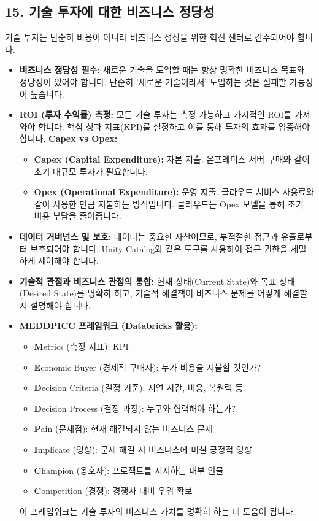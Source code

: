 \documentclass[11pt,a4paper]{article}
\theoremstyle{definition}
\begin{document}
\subsection*{15. 기술 투자에 대한 비즈니스 정당성}

기술 투자는 단순히 비용이 아니라 비즈니스 성장을 위한 혁신 센터로 간주되어야 합니다.

\begin{itemize}
    \item \textbf{비즈니스 정당성 필수:} 새로운 기술을 도입할 때는 항상 명확한 비즈니스 목표와 정당성이 있어야 합니다. 단순히 '새로운 기술이라서' 도입하는 것은 실패할 가능성이 높습니다.
    \item \textbf{ROI (투자 수익률) 측정:} 모든 기술 투자는 측정 가능하고 가시적인 ROI를 가져와야 합니다. 핵심 성과 지표(KPI)를 설정하고 이를 통해 투자의 효과를 입증해야 합니다.
    \textbf{Capex vs Opex:}
    \begin{itemize}
        \item \textbf{Capex (Capital Expenditure):} 자본 지출. 온프레미스 서버 구매와 같이 초기 대규모 투자가 필요합니다.
        \item \textbf{Opex (Operational Expenditure):} 운영 지출. 클라우드 서비스 사용료와 같이 사용한 만큼 지불하는 방식입니다. 클라우드는 Opex 모델을 통해 초기 비용 부담을 줄여줍니다.
    \end{itemize}
    \item \textbf{데이터 거버넌스 및 보호:} 데이터는 중요한 자산이므로, 부적절한 접근과 유출로부터 보호되어야 합니다. Unity Catalog와 같은 도구를 사용하여 접근 권한을 세밀하게 제어해야 합니다.
    \item \textbf{기술적 관점과 비즈니스 관점의 통합:} 현재 상태(Current State)와 목표 상태(Desired State)를 명확히 하고, 기술적 해결책이 비즈니스 문제를 어떻게 해결할지 설명해야 합니다.
    \item \textbf{MEDDPICC 프레임워크 (Databricks 활용):}
    \begin{itemize}
        \item \textbf{M}etrics (측정 지표): KPI
        \item \textbf{E}conomic Buyer (경제적 구매자): 누가 비용을 지불할 것인가?
        \item \textbf{D}ecision Criteria (결정 기준): 지연 시간, 비용, 복원력 등
        \item \textbf{D}ecision Process (결정 과정): 누구와 협력해야 하는가?
        \item \textbf{P}ain (문제점): 현재 해결되지 않는 비즈니스 문제
        \item \textbf{I}mplicate (영향): 문제 해결 시 비즈니스에 미칠 긍정적 영향
        \item \textbf{C}hampion (옹호자): 프로젝트를 지지하는 내부 인물
        \item \textbf{C}ompetition (경쟁): 경쟁사 대비 우위 확보
    \end{itemize}
    이 프레임워크는 기술 투자의 비즈니스 가치를 명확히 하는 데 도움이 됩니다.
\end{itemize}
\end{document}
